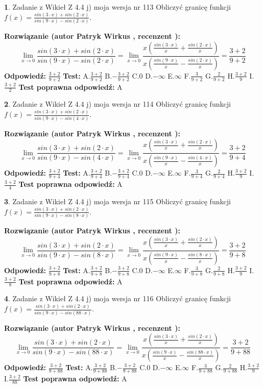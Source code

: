 \documentclass[12pt, a4paper]{article}
\theoremstyle{definition} %
\newtheorem{zad}{}
\newcommand{\zadStart}[1]{\begin{zad}#1\newline}
\newcommand{\zadStop}{\end{zad}}
\newcommand{\rozwStart}[2]{\noindent \textbf{Rozwiązanie (autor #1 , recenzent #2): }\newline}
\newcommand{\rozwStop}{\newline}
\newcommand{\odpStart}{\noindent \textbf{Odpowiedź:}\newline}
\newcommand{\odpStop}{\newline}
\newcommand{\testStart}{\noindent \textbf{Test:}\newline}
\newcommand{\testStop}{\newline}
\newcommand{\kluczStart}{\noindent \textbf{Test poprawna odpowiedź:}\newline}
\newcommand{\kluczStop}{\newline}
\begin{document}
\zadStart{Zadanie z Wikieł Z 4.4 j) moja wersja nr 113}
Obliczyć granicę funkcji $f(x)=\frac{sin(3\cdot x) +sin(2\cdot x)}{sin(9\cdot x) -sin(2\cdot x)}$.
\zadStop
\rozwStart{Patryk Wirkus}{}
$$\lim\limits_{x\to 0}\frac{sin(3\cdot x) +sin(2\cdot x)}{sin(9\cdot x) -sin(2\cdot x)}=\lim\limits_{x\to 0}\frac{x(\frac{sin(3\cdot x)}{x}+\frac{sin(2\cdot x)}{x})}{x(\frac{sin(9\cdot x)}{x}-\frac{sin(2\cdot x)}{x})}=\frac{3+2}{9+2}$$
\rozwStop
\odpStart
$\frac{3+2}{9+2}$
\odpStop
\testStart
A.$\frac{3+2}{9+2}$
B.$-\frac{3+2}{9+2}$
C.$0$
D.$-\infty$
E.$\infty$
F.$\frac{3}{9+2}$
G.$\frac{2}{9+2}$
H.$\frac{3+2}{9}$
I.$\frac{3+2}{2}$
\testStop
\kluczStart
A
\kluczStop



\zadStart{Zadanie z Wikieł Z 4.4 j) moja wersja nr 114}
Obliczyć granicę funkcji $f(x)=\frac{sin(3\cdot x) +sin(2\cdot x)}{sin(9\cdot x) -sin(4\cdot x)}$.
\zadStop
\rozwStart{Patryk Wirkus}{}
$$\lim\limits_{x\to 0}\frac{sin(3\cdot x) +sin(2\cdot x)}{sin(9\cdot x) -sin(4\cdot x)}=\lim\limits_{x\to 0}\frac{x(\frac{sin(3\cdot x)}{x}+\frac{sin(2\cdot x)}{x})}{x(\frac{sin(9\cdot x)}{x}-\frac{sin(4\cdot x)}{x})}=\frac{3+2}{9+4}$$
\rozwStop
\odpStart
$\frac{3+2}{9+4}$
\odpStop
\testStart
A.$\frac{3+2}{9+4}$
B.$-\frac{3+2}{9+4}$
C.$0$
D.$-\infty$
E.$\infty$
F.$\frac{3}{9+4}$
G.$\frac{2}{9+4}$
H.$\frac{3+2}{9}$
I.$\frac{3+2}{4}$
\testStop
\kluczStart
A
\kluczStop



\zadStart{Zadanie z Wikieł Z 4.4 j) moja wersja nr 115}
Obliczyć granicę funkcji $f(x)=\frac{sin(3\cdot x) +sin(2\cdot x)}{sin(9\cdot x) -sin(8\cdot x)}$.
\zadStop
\rozwStart{Patryk Wirkus}{}
$$\lim\limits_{x\to 0}\frac{sin(3\cdot x) +sin(2\cdot x)}{sin(9\cdot x) -sin(8\cdot x)}=\lim\limits_{x\to 0}\frac{x(\frac{sin(3\cdot x)}{x}+\frac{sin(2\cdot x)}{x})}{x(\frac{sin(9\cdot x)}{x}-\frac{sin(8\cdot x)}{x})}=\frac{3+2}{9+8}$$
\rozwStop
\odpStart
$\frac{3+2}{9+8}$
\odpStop
\testStart
A.$\frac{3+2}{9+8}$
B.$-\frac{3+2}{9+8}$
C.$0$
D.$-\infty$
E.$\infty$
F.$\frac{3}{9+8}$
G.$\frac{2}{9+8}$
H.$\frac{3+2}{9}$
I.$\frac{3+2}{8}$
\testStop
\kluczStart
A
\kluczStop



\zadStart{Zadanie z Wikieł Z 4.4 j) moja wersja nr 116}
Obliczyć granicę funkcji $f(x)=\frac{sin(3\cdot x) +sin(2\cdot x)}{sin(9\cdot x) -sin(88\cdot x)}$.
\zadStop
\rozwStart{Patryk Wirkus}{}
$$\lim\limits_{x\to 0}\frac{sin(3\cdot x) +sin(2\cdot x)}{sin(9\cdot x) -sin(88\cdot x)}=\lim\limits_{x\to 0}\frac{x(\frac{sin(3\cdot x)}{x}+\frac{sin(2\cdot x)}{x})}{x(\frac{sin(9\cdot x)}{x}-\frac{sin(88\cdot x)}{x})}=\frac{3+2}{9+88}$$
\rozwStop
\odpStart
$\frac{3+2}{9+88}$
\odpStop
\testStart
A.$\frac{3+2}{9+88}$
B.$-\frac{3+2}{9+88}$
C.$0$
D.$-\infty$
E.$\infty$
F.$\frac{3}{9+88}$
G.$\frac{2}{9+88}$
H.$\frac{3+2}{9}$
I.$\frac{3+2}{88}$
\testStop
\kluczStart
A
\kluczStop
\end{document}
